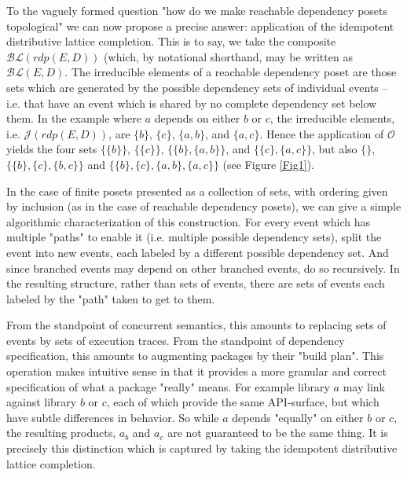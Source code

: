 \documentclass[hoptionsi,review,format=acmsmall]{acmart}
\theoremstyle{definition}
\newcommand{\Oc}{\mathcal{O}}
\newcommand{\Jc}{\mathcal{J}}
\newcommand{\BLc}{\mathcal{BL}}
\begin{document}


To the vaguely formed question "how do we make reachable dependency posets topological" we can now propose a precise answer: application of the idempotent distributive lattice completion. This is to say, we take the composite \(\BLc(rdp(E,D))\) (which, by notational shorthand, may be written as \(\BLc(E,D)\). The irreducible elements of a reachable dependency poset are those sets which are generated by the possible dependency sets of individual events -- i.e. that have an event which is shared by no complete dependency set below them. In the example where \(a\) depends on either \(b\) or \(c\), the irreducible elements, i.e. \(\Jc(rdp(E,D))\), are \(\{b\}\), \(\{c\}\), \(\{a,b\}\), and \(\{a,c\}\). Hence the application of \(\Oc\) yields the four sets \(\{\{b\}\}\), \(\{\{c\}\}\), \(\{\{b\},\{a,b\}\}\), and \(\{\{c\},\{a,c\}\}\), but also \(\{\}\), \(\{\{b\},\{c\},\{b,c\}\}\) and \(\{\{b\},\{c\},\{a,b\},\{a,c\}\}\) (see Figure \ref{Fig1}).

In the case of finite posets presented as a collection of sets, with ordering given by inclusion (as in the case of reachable dependency posets), we can give a simple algorithmic characterization of this construction. For every event which has multiple "paths" to enable it (i.e. multiple possible dependency sets), split the event into new events, each labeled by a different possible dependency set. And since branched events may depend on other branched events, do so recursively. In the resulting structure, rather than sets of events, there are sets of events each labeled by the "path" taken to get to them. 

From the standpoint of concurrent semantics, this amounts to replacing sets of events by sets of execution traces. From the standpoint of dependency specification, this amounts to augmenting packages by their "build plan". This operation makes intuitive sense in that it provides a more granular and correct specification of what a package "really" means. For example library \(a\) may link against library \(b\) or \(c\), each of which provide the same API-surface, but which have subtle differences in behavior. So while \(a\) depends "equally" on either \(b\) or \(c\), the resulting products, \(a_b\) and \(a_c\) are not guaranteed to be the same thing. It is precisely this distinction which is captured by taking the idempotent distributive lattice completion.
\end{document}
